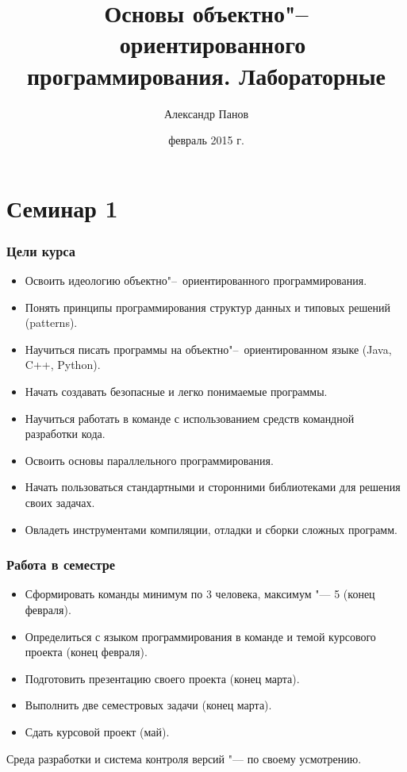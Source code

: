 \documentclass[default]{beamer}
\begin{document}
	
	\title[ООП. Лабораторные]{Основы объектно"--~ориентированного программирования.
		Лабораторные}
	\author[Панов]{Александр Панов}
	\date{февраль 2015 г.} 
	
	\begin{frame}
		\titlepage
	\end{frame}
	
	\section {Семинар 1}
	
	\begin{frame}
		\frametitle{Цели курса}
		
		\begin{itemize}
			\item Освоить идеологию объектно"--~ориентированного программирования.
			\item Понять принципы программирования структур данных и типовых решений
			(patterns).
			\item Научиться писать программы на объектно"--~ориентированном языке (Java,
			C++, Python).
			\item Начать создавать безопасные и легко понимаемые программы.
			\item Научиться работать в команде с использованием средств командной
			разработки кода.
			\item Освоить основы параллельного программирования.
			\item Начать пользоваться стандартными и сторонними библиотеками для решения
			своих задачах.
			\item Овладеть инструментами компиляции, отладки и сборки сложных программ.
		\end{itemize}
	\end{frame}
	
	\begin{frame}
		\frametitle{Работа в семестре}
		
		\begin{itemize}
			\item Сформировать команды минимум по 3 человека, максимум "--- 5 (конец
			февраля).
			\item Определиться с языком программирования в команде и темой курсового
			проекта (конец февраля).
			\item Подготовить презентацию своего проекта (конец марта).
			\item Выполнить две семестровых задачи (конец марта).
			\item Сдать курсовой проект (май).
		\end{itemize}
		
		\par\bigskip
		Среда разработки и система контроля версий "--- по своему усмотрению.
	\end{frame}
	
\end{document}
